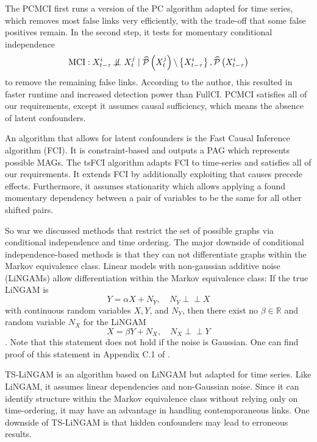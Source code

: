 \documentclass[conference]{IEEEtran}
\begin{document}
The PCMCI first runs a version of the PC algorithm adapted for time series, which removes most false links very efficiently, with the trade-off that some false positives remain\cite{runge_pcmci_2019}. In the second step, it tests for momentary conditional independence
\begin{equation}
\mathrm{MCI}: X_{t-\tau}^{i} \not\!\perp\!\!\!\perp X_{t}^{j} \mid \widehat{\mathcal{P}}\left(X_{t}^{j}\right) \backslash\left\{X_{t-\tau}^{i}\right\}, \widehat{\mathcal{P}}\left(X_{t-\tau}^{i}\right)
\end{equation}
to remove the remaining false links\cite{runge_pcmci_2019}.
According to the author, this resulted in faster runtime and increased detection power than FullCI\cite{runge_pcmci_2019}.
PCMCI satisfies all of our requirements, except it assumes causal sufficiency, which means the absence of latent confounders.

An algorithm that allows for latent confounders is the Fast Causal Inference algorithm (FCI)\cite{spirtes_causation_2000}. It is constraint-based and outputs a PAG which represents possible MAGs.
The tsFCI algorithm adapts FCI to time-series \cite{entner_causal_2010} and satisfies all of our requirements. It extends FCI by additionally exploiting that causes precede effects. Furthermore, it assumes stationarity which allows applying a found momentary dependency between a pair of variables to be the same for all other shifted pairs.

So war we discussed methods that restrict the set of possible graphs via conditional independence and time ordering. The major downside of conditional independence-based methods is that they can not differentiate graphs within the Markov equivalence class. 
Linear models with non-gaussian additive noise (LiNGAMs) allow differentiation within the Markov equivalence class: 
If the true LiNGAM is 
\begin{equation}
Y=\alpha X+N_{Y}, \quad N_{Y} \!\perp\!\!\!\perp X
\end{equation}
with continuous random variables $X, Y$, and $N_Y$, then there exist no $\beta\in\mathbb{R}$ and random variable $N_X$ for the LiNGAM
\begin{equation}
X=\beta Y+N_{X}, \quad N_{X} \!\perp\!\!\!\perp Y
\end{equation}\cite{peters_elements_2018}.
Note that this statement does not hold if the noise is Gaussian.
One can find proof of this statement in Appendix C.1 of \cite{peters_elements_2018}.

TS-LiNGAM is an algorithm based on LiNGAM but adapted for time series\cite{hyvarinen_causal_2008}. Like LiNGAM, it assumes linear dependencies and non-Gaussian noise. Since it can identify structure within the Markov equivalence class without relying only on time-ordering, it may have an advantage in handling contemporaneous links.
One downside of TS-LiNGAM is that hidden confounders may lead to erroneous results\cite{peters_causal_2013}.
\end{document}
